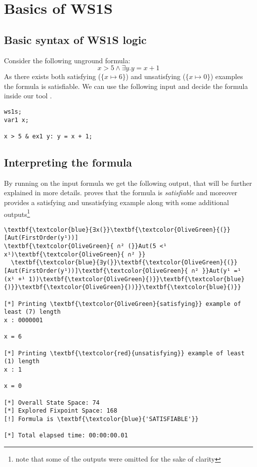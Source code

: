  
\chapter{Basics of WS1S}
\begin{intro}

\end{intro}

\section{Basic syntax of WS1S logic}
Consider the following unground formula:
\begin{equation}
x > 5 \wedge \exists y. y = x + 1
\end{equation}
As there exists both satisfying ($\{x \mapsto 6\}$) and unsatisfying ($\{x \mapsto 0\}$) examples
the formula is satisfiable. We can use the following input and decide the formula inside our
tool \gaston.

\begin{Verbatim}[label={input.mona}]
ws1s;
var1 x;

x > 5 & ex1 y: y = x + 1;
\end{Verbatim}

\section{Interpreting the formula}
By running \gaston on the input formula we get the following output, that will be further
explained in more details. \gaston proves that the formula is \emph{satisfiable} and 
moreover provides a satisfying and unsatisfying example along with some additional
outputs\footnote{note that some of the outputs were omitted for the sake of clarity}

\begin{Verbatim}                                                                   
\textbf{\textcolor{blue}{∃x(}}\textbf{\textcolor{OliveGreen}{(}}[Aut(FirstOrder(y¹))] 
\textbf{\textcolor{OliveGreen}{ ∩² (}}Aut(5 <¹ x¹)\textbf{\textcolor{OliveGreen}{ ∩² }}
  \textbf{\textcolor{blue}{∃y(}}\textbf{\textcolor{OliveGreen}{(}}[Aut(FirstOrder(y¹))]\textbf{\textcolor{OliveGreen}{ ∩² }}Aut(y¹ =¹ (x¹ +¹ 1))\textbf{\textcolor{OliveGreen}{)}}\textbf{\textcolor{blue}{)}}\textbf{\textcolor{OliveGreen}{))}}\textbf{\textcolor{blue}{)}}

[*] Printing \textbf{\textcolor{OliveGreen}{satisfying}} example of least (7) length
x : 0000001

x = 6

[*] Printing \textbf{\textcolor{red}{unsatisfying}} example of least (1) length
x : 1

x = 0

[*] Overall State Space: 74
[*] Explored Fixpoint Space: 168
[!] Formula is \textbf{\textcolor{blue}{'SATISFIABLE'}}

[*] Total elapsed time: 00:00:00.01
\end{Verbatim}

